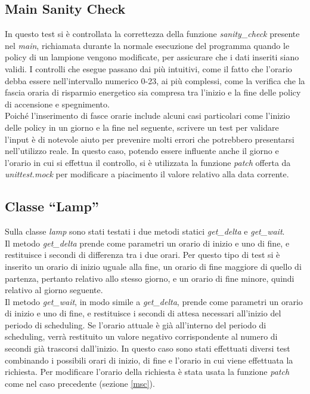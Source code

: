 \subsection{Main Sanity Check \label{msc}}
In questo test si è controllata la correttezza della funzione \textit{sanity\_check} presente nel \textit{main}, richiamata durante la normale esecuzione del programma quando le policy di un lampione vengono modificate, per assicurare che i dati inseriti siano validi.
I controlli che esegue passano dai più intuitivi, come il fatto che l'orario debba essere nell'intervallo numerico 0-23, ai più complessi, come la verifica che la fascia oraria di risparmio energetico sia compresa tra l'inizio e la fine delle policy di accensione e spegnimento.
\\Poiché l'inserimento di fasce orarie include alcuni casi particolari come l'inizio delle policy in un giorno e la fine nel seguente, scrivere un test per validare l'input è di notevole aiuto per prevenire molti errori che potrebbero presentarsi nell'utilizzo reale.
In questo caso, potendo essere influente anche il giorno e l'orario in cui si effettua il controllo, si è utilizzata la funzione \textit{patch} offerta da \textit{unittest.mock} per modificare a piacimento il valore relativo alla data corrente.

\subsection{Classe ``Lamp''}
Sulla classe \textit{lamp} sono stati testati i due metodi statici \textit{get\_delta} e \textit{get\_wait}.
\\Il metodo \textit{get\_delta} prende come parametri un orario di inizio e uno di fine, e restituisce i secondi di differenza tra i due orari.
Per questo tipo di test si è inserito un orario di inizio uguale alla fine, un orario di fine maggiore di quello di partenza, pertanto relativo allo stesso giorno, e un orario di fine minore, quindi relativo al giorno seguente.
\\Il metodo \textit{get\_wait}, in modo simile a \textit{get\_delta}, prende come parametri un orario di inizio e uno di fine, e restituisce i secondi di attesa necessari all'inizio del periodo di scheduling.
Se l'orario attuale è già all'interno del periodo di scheduling, verrà restituito un valore negativo corrispondente al numero di secondi già trascorsi dall'inizio.
In questo caso sono stati effettuati diversi test combinando i possibili orari di inizio, di fine e l'orario in cui viene effettuata la richiesta.
Per modificare l'orario della richiesta è stata usata la funzione \textit{patch} come nel caso precedente (sezione \ref{msc}).

